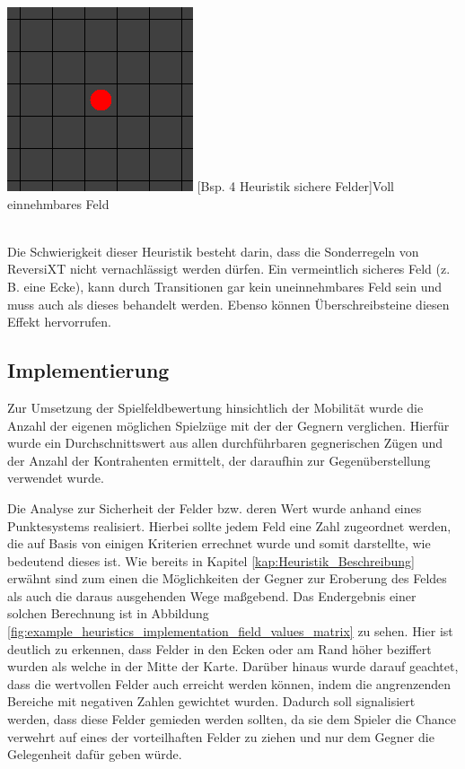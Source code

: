 \documentclass[12pt,a4paper,bibliography=totocnumbered,listof=totocnumbered]{article}
\begin{document}
\vspace{1em}
\begin{minipage}{\linewidth}
	\centering
	\includegraphics[width=0.3\linewidth]{pics/heuristics_safe_fields_middle.png}
	[Bsp. 4 Heuristik sichere Felder]{Voll einnehmbares Feld}
	\label{fig:example_heuristics_safe_fields_middle}
\end{minipage}
\\

Die Schwierigkeit dieser Heuristik besteht darin, dass die Sonderregeln von ReversiXT nicht vernachlässigt werden dürfen. Ein vermeintlich sicheres Feld (z. B. eine Ecke), kann durch Transitionen gar kein uneinnehmbares Feld sein und muss auch als dieses behandelt werden. Ebenso können Überschreibsteine diesen Effekt hervorrufen.

\subsection{Implementierung}\label{kap:Heurisitk_Implementierung} %
Zur Umsetzung der Spielfeldbewertung hinsichtlich der Mobilität wurde die Anzahl der eigenen möglichen Spielzüge mit der der Gegnern verglichen. Hierfür wurde ein Durchschnittswert aus allen durchführbaren gegnerischen Zügen und der Anzahl der Kontrahenten ermittelt, der daraufhin zur Gegenüberstellung verwendet wurde.


Die Analyse zur Sicherheit der Felder bzw. deren Wert wurde anhand eines Punktesystems realisiert. Hierbei sollte jedem Feld eine Zahl zugeordnet werden, die auf Basis von einigen Kriterien errechnet wurde und somit darstellte, wie bedeutend dieses ist. Wie bereits in Kapitel \ref{kap:Heuristik_Beschreibung} erwähnt sind zum einen die Möglichkeiten der Gegner zur Eroberung des Feldes als auch die daraus ausgehenden Wege maßgebend. Das Endergebnis einer solchen Berechnung ist in Abbildung \ref{fig:example_heuristics_implementation_field_values_matrix} zu sehen. Hier ist deutlich zu erkennen, dass Felder in den Ecken oder am Rand höher beziffert wurden als welche in der Mitte der Karte. Darüber hinaus wurde darauf geachtet, dass die wertvollen Felder auch erreicht werden können, indem die angrenzenden Bereiche mit negativen Zahlen gewichtet wurden. Dadurch soll signalisiert werden, dass diese Felder gemieden werden sollten, da sie dem Spieler die Chance verwehrt auf eines der vorteilhaften Felder zu ziehen und nur dem Gegner die Gelegenheit dafür geben würde. 
\end{document}
